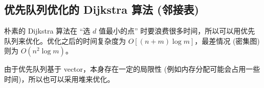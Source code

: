 \subsection{优先队列优化的 Dijkstra 算法 (邻接表)}
	朴素的 Dijkstra 算法在 “选 $d$ 值最小的点” 时要浪费很多时间，所以可以用优先队列来优化。优化之后的时间复杂度为 $O[(n+m)\log m]$，最差情况 (密集图) 则为 $O(n^{2}\log m)$。

	由于优先队列基于 vector，本身存在一定的局限性 (例如内存分配可能会占用一些时间)，所以也可以采用堆来优化。
	
	